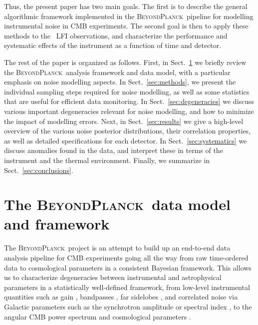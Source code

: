 \documentclass[twocolumn]{aa}
\newcommand{\BP}{\textsc{BeyondPlanck}}
\begin{document}
Thus, the present paper has two main goals. The first is to describe
the general algorithmic framework implemented in the \BP\ pipeline for
modelling instrumental noise in CMB experiments. The second goal is
then to apply these methods to the \Planck\ LFI observations, and
characterize the performance and systematic effects of the instrument
as a function of time and detector.

The rest of the paper is organized as follows. First, in
Sect.~\ref{sec:bp} we briefly review the \BP\ analysis framework and
data model, with a particular emphasis on noise modelling aspects. In
Sect.~\ref{sec:methods}, we present the individual sampling steps
required for noise modelling, as well as some statistics that are useful
for efficient data monitoring. In Sect.~\ref{sec:degeneracies} we
discuss various important degeneracies relevant for noise modelling, 
and how to minimize the impact of modelling errors. Next, in
Sect.~\ref{sec:results} we give a high-level overview of the various
noise posterior distributions,  their correlation
properties, as well as detailed specifications for each detector. In
Sect.~\ref{sec:systematics} we discuss anomalies found in the data,
and interpret these in terms of the instrument and the thermal
environment. Finally, we summarize in
Sect.~\ref{sec:conclusions}.



\section{The \BP\ data model and framework}
\label{sec:bp}
The \BP\ project is an attempt to build up an end-to-end data analysis
pipeline for CMB experiments going all the way from raw time-ordered
data to cosmological parameters in a consistent Bayesian
framework. This allows us to characterize degeneracies between
instrumental and astrophysical parameters in a statistically
well-defined framework, from low-level instrumental quantities such as
gain \citep{bp09}, bandpasses \citep{bp12}, far sidelobes \citep{bp10}, and correlated noise via Galactic parameters such as
the synchrotron amplitude or spectral index \citep{bp18,bp19}, to the angular
CMB power spectrum and cosmological parameters \citep{bp14,bp15}.
\end{document}
